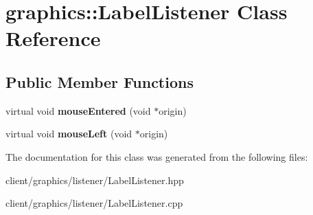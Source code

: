 \hypertarget{classgraphics_1_1_label_listener}{\section{graphics\-:\-:Label\-Listener Class Reference}
\label{classgraphics_1_1_label_listener}
}
\subsection*{Public Member Functions}
\begin{DoxyCompactItemize}
\item 
\hypertarget{classgraphics_1_1_label_listener_ada865b1a1cde6244a23353b47c32dae9}{virtual void {\bfseries mouse\-Entered} (void $\ast$origin)}\label{classgraphics_1_1_label_listener_ada865b1a1cde6244a23353b47c32dae9}

\item 
\hypertarget{classgraphics_1_1_label_listener_ae1a3d11f1d947f07f1e1c5f741cf0767}{virtual void {\bfseries mouse\-Left} (void $\ast$origin)}\label{classgraphics_1_1_label_listener_ae1a3d11f1d947f07f1e1c5f741cf0767}

\end{DoxyCompactItemize}


The documentation for this class was generated from the following files\-:\begin{DoxyCompactItemize}
\item 
client/graphics/listener/Label\-Listener.\-hpp\item 
client/graphics/listener/Label\-Listener.\-cpp\end{DoxyCompactItemize}
